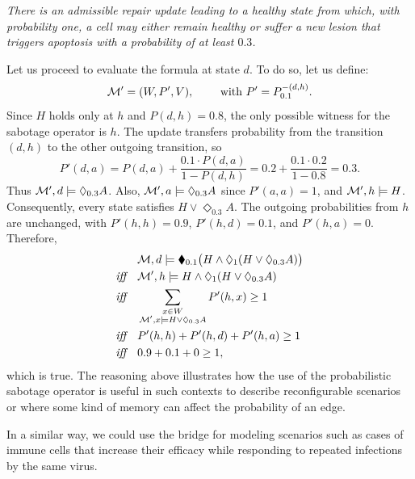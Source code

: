 \medskip


\textit{There is an admissible repair update leading to a healthy state from which, with probability one, a cell may either remain healthy or suffer a new lesion that triggers apoptosis with a probability of at least $0.3$.}

\medskip

Let us proceed to evaluate the formula at state $d$. To do so, let us define:
\[
    \mathcal{M}'=(W,P',V), \qquad \text{ with } P'=P^{-(d,h)}_{0.1}.
\]
Since $H$ holds only at $h$ and $P(d,h)=0.8$, the only possible witness for
the sabotage operator is $h$. The update transfers probability from the
transition $(d,h)$ to the other outgoing transition, so
\[
    P'(d,a)
    =P(d,a)+\frac{0.1\cdot P(d,a)}{1-P(d,h)}
    =0.2+\frac{0.1\cdot0.2}{1-0.8}
    =0.3.
\]
Thus $\mathcal{M}',d\models\Diamond_{0.3}A$. Also,
$\mathcal{M}',a\models\Diamond_{0.3}A$ since $P'(a,a)=1$, and
$\mathcal{M}',h\models H$. Consequently, every state satisfies
$H\vee\Diamond_{0.3}A$. The outgoing probabilities from $h$ are unchanged,
with $P'(h,h)=0.9$, $P'(h,d)=0.1$, and $P'(h,a)=0$. Therefore,
\begin{align*}
   &  \M,d\models\blacklozenge_{0.1}
        \bigl(H\wedge\Diamond_1(H\vee\Diamond_{0.3}A)\bigr)\\
    \iff \quad  & \M',h\models
        H\wedge\Diamond_1(H\vee\Diamond_{0.3}A)\\
    \iff \quad  & \sum_{\substack{x\in W\\
        \M',x\models H\vee\Diamond_{0.3}A}}P'(h,x)\geq 1\\
    \iff \quad & P'(h,h)+P'(h,d)+P'(h,a)\geq 1\\
    \iff \quad & 0.9+0.1+0\geq 1, %
\end{align*}
which is true. The reasoning above illustrates how the use of the probabilistic sabotage operator is useful in such contexts to describe reconfigurable scenarios or where some kind of memory can affect the probability of an edge.

In a similar way, we could use the bridge for modeling scenarios such as cases of immune cells that increase their efficacy while responding to repeated infections by the same virus.